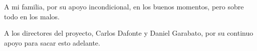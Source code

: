 \documentclass[11pt,a4paper,titlepage,twoside,openright,openbib]{report}
\begin{document}

 
 \paxinaenbranco
 \paxinaenbranco
 \paxinaenbranco
 \begin{agradecementos}
 
 A mi familia, por su apoyo incondicional, en los buenos momentos, pero sobre todo en los malos.
 
 A los directores del proyecto, Carlos Dafonte y Daniel Garabato, por su continuo apoyo para sacar esto adelante.

 
 \end{agradecementos}
 \paxinaenbranco
 
 \paxinaenbranco
 \paxinaenbranco

 \setcounter{page}{1}

 \tableofcontents
 \listoffigures
 \listoftables
 \cleardoublepage
 
 \setcounter{page}{1}


 
 
 
 
 
 
 
 
 
 
 


 \appendix
 \appendixpage
 
 

 
 
 \cleardoublepage
 
\end{document}
